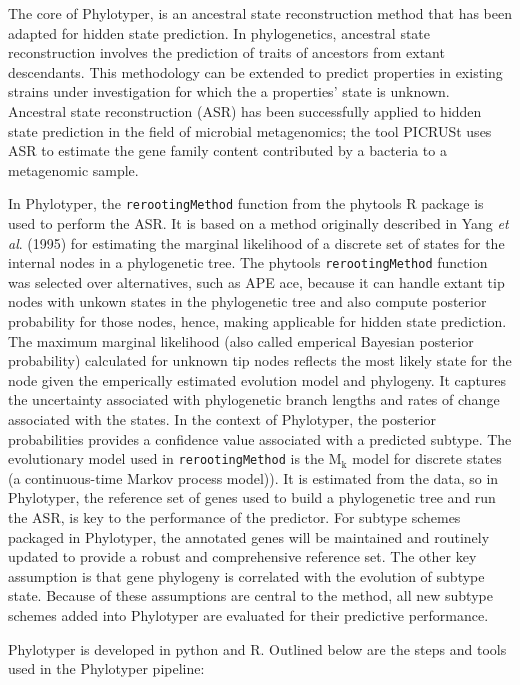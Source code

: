 \documentclass{bioinfo}
\begin{document}
The core of Phylotyper, is an ancestral state reconstruction method that has been adapted for hidden state prediction.
In phylogenetics, ancestral state reconstruction involves the prediction of traits of ancestors from extant descendants.
This methodology can be extended to predict properties in existing strains under investigation for which the a properties' state is unknown.
Ancestral state reconstruction (ASR) has been successfully applied to hidden state prediction in the field of microbial metagenomics; the tool PICRUSt uses ASR to estimate the gene family content contributed by a bacteria to a metagenomic sample.

In Phylotyper, the \texttt{rerootingMethod} function from the phytools R package is used to perform the ASR.
It is based on a method originally described in Yang \emph{et al}. (1995) for estimating the marginal likelihood of a discrete set of states for the internal nodes in a phylogenetic tree.
The phytools \texttt{rerootingMethod} function was selected over alternatives, such as APE ace, because it can handle extant tip nodes with unkown states in the phylogenetic tree and also compute posterior probability for those nodes, hence, making applicable for hidden state prediction.
The maximum marginal likelihood (also called emperical Bayesian posterior probability) calculated for unknown tip nodes reflects the most likely state for the node given the emperically estimated evolution model and phylogeny.
It captures the uncertainty associated with phylogenetic branch lengths and rates of change associated with the states.
In the context of Phylotyper, the posterior probabilities provides a confidence value associated with a predicted subtype.
The evolutionary model used in \texttt{rerootingMethod} is the $\text{M}_{\text{k}}$ model for discrete states (a continuous-time Markov process model)).  
It is estimated from the data, so in Phylotyper, the reference set of genes used to build a phylogenetic tree and run the ASR, is key to the performance of the predictor.
For subtype schemes packaged in Phylotyper, the annotated genes will be maintained and routinely updated to provide a robust and comprehensive reference set.
The other key assumption is that gene phylogeny is correlated with the evolution of subtype state.
Because of these assumptions are central to the method, all new subtype schemes added into Phylotyper are evaluated for their predictive performance.

Phylotyper is developed in python and R. 
Outlined below are the steps and tools used in the Phylotyper pipeline:
\end{document}
